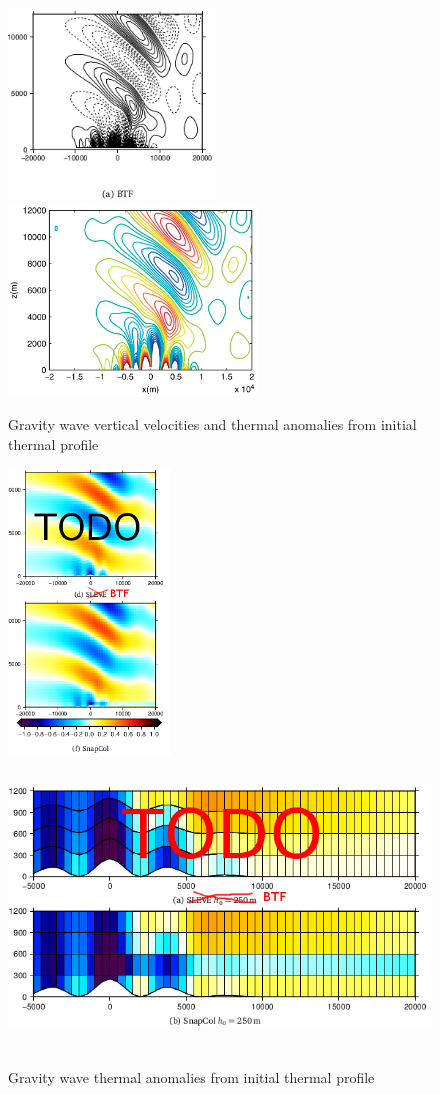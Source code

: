 \documentclass{ametsoc}
\begin{document}
\begin{figure}
	\includegraphics[height=2in]{gw-w-btf.png}
	\includegraphics[height=2in]{melvin-7a.png}
%
	\caption{Gravity wave vertical velocities and thermal anomalies from initial thermal profile}
	\label{fig:gw-w}
\end{figure}

\begin{figure}
	\includegraphics[height=3in]{gw-theta.png}
	\includegraphics[height=3in]{gw-theta-zoom.png}
%
	\caption{Gravity wave thermal anomalies from initial thermal profile}
	\label{fig:gw-theta}
\end{figure}
\end{document}
